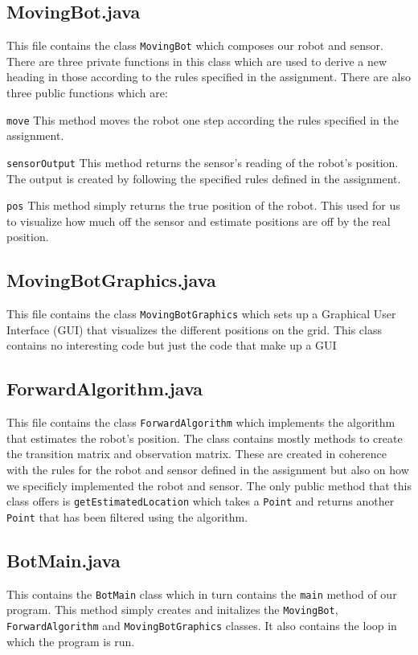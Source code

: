 \documentclass[a4paper]{article}
\begin{document}
\subsection{MovingBot.java}
This file contains the class \texttt{MovingBot} which composes our robot and sensor. There are three private functions in this class which are used to derive a new heading in those according to the rules specified in the assignment. There are also three public functions which are:
\begin{description}
\item{\texttt{move}} This method moves the robot one step according the rules specified in the assignment.
\item{\texttt{sensorOutput}} This method returns the sensor's reading of the robot's position. The output is created by following the specified rules defined in the assignment.
\item{\texttt{pos}} This method simply returns the true position of the robot. This used for us to visualize how much off the sensor and estimate positions are off by the real position.
\end{description}

\subsection{MovingBotGraphics.java}
This file contains the class \texttt{MovingBotGraphics} which sets up a Graphical User Interface (GUI) that visualizes the different positions on the grid. This class contains no interesting code but just the code that make up a GUI
\subsection{ForwardAlgorithm.java} This file contains the class \texttt{ForwardAlgorithm} which implements the algorithm that estimates the robot's position. The class contains mostly methods to create the transition matrix and observation matrix. These are created in coherence with the rules for the robot and sensor defined in the assignment but also on how we specificly implemented the robot and sensor. The only public method that this class offers is \texttt{getEstimatedLocation} which takes a \texttt{Point} and returns another \texttt{Point} that has been filtered using the algorithm.
\subsection{BotMain.java} This contains the \texttt{BotMain} class which in turn contains the \texttt{main} method of our program. This method simply creates and initalizes the \texttt{MovingBot}, \texttt{ForwardAlgorithm} and \texttt{MovingBotGraphics} classes. It also contains the loop in which the program is run. 
\end{document}

